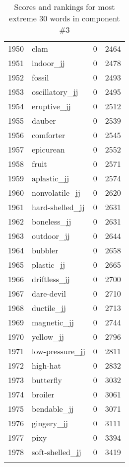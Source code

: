 \begin{longtable}[!htbp]{| rlr@{.}l |}
    1950 & clam & 0 & 2464 \\
    1951 & indoor\_jj & 0 & 2478 \\
    1952 & fossil & 0 & 2493 \\
    1953 & oscillatory\_jj & 0 & 2495 \\
    1954 & eruptive\_jj & 0 & 2512 \\
    1955 & dauber & 0 & 2539 \\
    1956 & comforter & 0 & 2545 \\
    1957 & epicurean & 0 & 2552 \\
    1958 & fruit & 0 & 2571 \\
    1959 & aplastic\_jj & 0 & 2574 \\
    1960 & nonvolatile\_jj & 0 & 2620 \\
    1961 & hard-shelled\_jj & 0 & 2631 \\
    1962 & boneless\_jj & 0 & 2631 \\
    1963 & outdoor\_jj & 0 & 2644 \\
    1964 & bubbler & 0 & 2658 \\
    1965 & plastic\_jj & 0 & 2665 \\
    1966 & driftless\_jj & 0 & 2700 \\
    1967 & dare-devil & 0 & 2710 \\
    1968 & ductile\_jj & 0 & 2713 \\
    1969 & magnetic\_jj & 0 & 2744 \\
    1970 & yellow\_jj & 0 & 2796 \\
    1971 & low-pressure\_jj & 0 & 2811 \\
    1972 & high-hat & 0 & 2832 \\
    1973 & butterfly & 0 & 3032 \\
    1974 & broiler & 0 & 3061 \\
    1975 & bendable\_jj & 0 & 3071 \\
    1976 & gingery\_jj & 0 & 3111 \\
    1977 & pixy & 0 & 3394 \\
    1978 & soft-shelled\_jj & 0 & 3419 \\
    \hline
    \caption{Scores and rankings for most extreme 30 words in component \#3} \\
\end{longtable}
